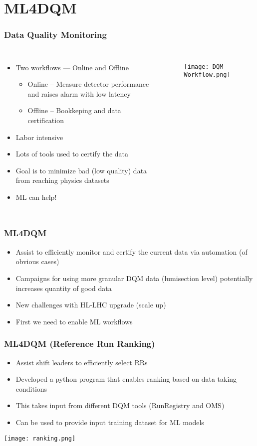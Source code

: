 \documentclass[aspectratio=1610]{beamer}
\begin{document}
\section{ML4DQM}
\begin{frame}
	\frametitle{Data Quality Monitoring}
	\begin{columns}
		\begin{itemize}
			\item Two workflows --- Online and Offline
			      \begin{itemize}
				      \item Online -- Measure detector performance and raises alarm with low latency
				      \item Offline -- Bookkeping and data certification
			      \end{itemize}
			\item Labor intensive
			\item Lots of tools used to certify the data
			\item Goal is to minimize bad (low quality) data from reaching physics datasets
			\item ML can help!
		\end{itemize}
		\begin{figure}
			\centering
			\texttt{[image: DQM Workflow.png]}
		\end{figure}
	\end{columns}
\end{frame}


\begin{frame}
	\frametitle{ML4DQM}

	\begin{itemize}
		\item Assist to efficiently monitor and certify the current data via automation (of obvious cases)
		\item Campaigns for using more granular DQM data (lumisection level) potentially increases quantity of good data
		\item New challenges with HL-LHC upgrade (scale up)
		\item First we need to enable ML workflows
	\end{itemize}

\end{frame}

\begin{frame}
	\frametitle{ML4DQM (Reference Run Ranking)}
	\begin{itemize}
		\item Assist shift leaders to efficiently select RRs
		\item Developed a python program that enables ranking based on data taking conditions
		\item This takes input from different DQM tools (RunRegistry and OMS)
		\item Can be used to provide input training dataset for ML models
	\end{itemize}
	\texttt{[image: ranking.png]}
\end{frame}
\end{document}
